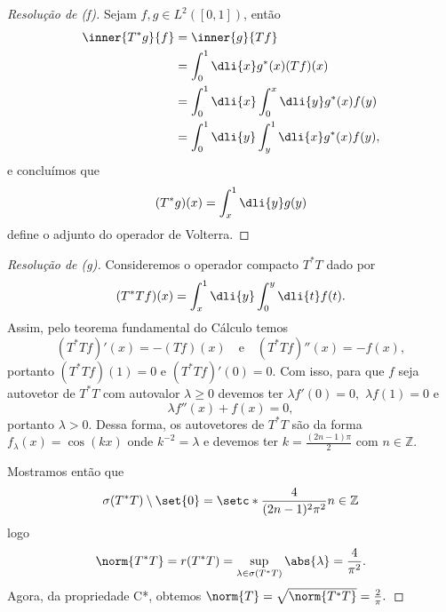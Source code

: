 \begin{proof}[Resolução de (f)]
  Sejam \(f, g \in L^2([0,1])\), então
  \begin{align*}
    \inner{T^*g}{f} &= \inner{g}{Tf}\\
                    &= \int_0^1 \dli{x}g^*(x) (Tf)(x)\\
                    &= \int_0^1 \dli{x} \int_0^x \dli{y} g^*(x) f(y)\\
                    &= \int_0^1 \dli{y} \int_y^1 \dli{x} g^*(x) f(y),
  \end{align*}
  e concluímos que
  \begin{equation*}
    (T^*g)(x) = \int_x^1 \dli{y} g(y)
  \end{equation*}
  define o adjunto do operador de Volterra.
\end{proof}
\begin{proof}[Resolução de (g)]
    Consideremos o operador compacto \(T^*T\) dado por
    \begin{equation*}
      (T^*Tf)(x) = \int_x^1 \dli{y} \int_0^y \dli{t} f(t).
    \end{equation*}
    Assim, pelo teorema fundamental do Cálculo temos
    \begin{equation*}
      (T^*Tf)'(x) = -(Tf)(x)\quad\text{e}\quad(T^*Tf)''(x) = -f(x),
    \end{equation*}
    portanto \((T^*Tf)(1) = 0\) e \((T^*Tf)'(0) = 0.\) Com isso, para que \(f\) seja autovetor de \(T^*T\) com autovalor \(\lambda \geq 0\) devemos ter \(\lambda f'(0) = 0,\) \(\lambda f(1) = 0\) e
    \begin{equation*}
        \lambda f''(x) + f(x) = 0,
    \end{equation*}
    portanto \(\lambda > 0.\) Dessa forma, os autovetores de \(T^*T\) são da forma \(f_\lambda(x) = \cos(kx)\) onde \(k^{-2} = \lambda\) e devemos ter \(k = \frac{(2n - 1)\pi}{2}\) com \(n \in \mathbb{Z}\).

    Mostramos então que
    \begin{equation*}
      \sigma(T^*T) \setminus \set{0} = \setc*{\frac{4}{(2n - 1)^2\pi^2}}{n \in \mathbb{Z}}
    \end{equation*}
    logo
    \begin{equation*}
      \norm{T^*T} = r(T^*T) = \sup_{\lambda \in \sigma(T^*T)}{\abs{\lambda}} = \frac{4}{\pi^2}.
    \end{equation*}
    Agora, da propriedade C*, obtemos \(\norm{T} = \sqrt{\norm{T^*T}} = \frac{2}{\pi}.\)
\end{proof}
